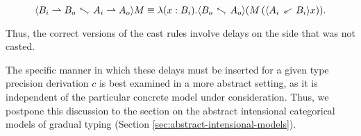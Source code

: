 \[ \up{A_i \ra A_o}{B_i \ra B_o}{M} \equiv \lambda (x : B_i). \up{A_o}{B_o}(M\, (\dn {A_i}{B_i} x)). \]

Thus, the correct versions of the cast rules involve delays on the side that was not casted.

The specific manner in which these delays must be inserted for a given type precision
derivation $c$ is best examined in a more abstract setting, as it is independent of the
particular concrete model under consideration.
Thus, we postpone this discussion to the section on the abstract intensional categorical models of
gradual typing (Section \ref{sec:abstract-intensional-models}).




